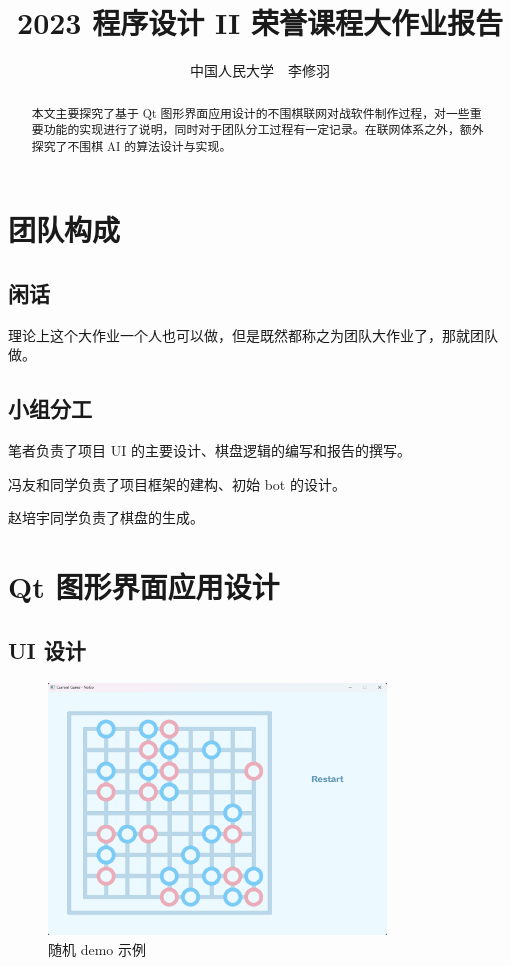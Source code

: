 \documentclass{noithesis}
\begin{document}
	
	\title{2023 程序设计 II 荣誉课程大作业报告}
	\author{中国人民大学~~李修羽}
	
	\maketitle
	
	\begin{abstract}
		本文主要探究了基于 Qt 图形界面应用设计的不围棋联网对战软件制作过程，对一些重要功能的实现进行了说明，同时对于团队分工过程有一定记录。在联网体系之外，额外探究了不围棋 AI 的算法设计与实现。
	\end{abstract}

	\tableofcontents
	\setcounter{page}{0}
	\thispagestyle{empty}
	\newpage
	
	\section{团队构成}
	
	\subsection{闲话}
	
	理论上这个大作业一个人也可以做，但是既然都称之为团队大作业了，那就团队做。
	
	\subsection{小组分工}
	
	笔者负责了项目 UI 的主要设计、棋盘逻辑的编写和报告的撰写。
	
	冯友和同学负责了项目框架的建构、初始 bot 的设计。
	
	赵培宇同学负责了棋盘的生成。
	
	\section{Qt 图形界面应用设计}
	
	
	\subsection{UI 设计}
	
	\begin{figure}[!htb]{
		\centering
		\includegraphics[width=0.8\textwidth]{img/UI.png}
			\caption{随机 demo 示例}
	}
	\end{figure}
\end{document}
